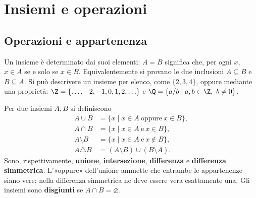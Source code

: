 \chapter{Insiemi e operazioni}

\section{Operazioni e appartenenza}
Un insieme è determinato dai suoi elementi: $A=B$ significa che, per ogni $x$, $x\in A$ se e solo se $x\in B$. Equivalentemente si provano le due inclusioni $A\subseteq B$ e $B\subseteq A$. Si può descrivere un insieme per elenco, come $\{2,3,4\}$, oppure mediante una proprietà: $\Z=\{\ldots,-2,-1,0,1,2,\ldots\}$ e $\Q=\{a/b\mid a,b\in\Z,\ b\ne0\}$.

\begin{definizione}
Per due insiemi $A,B$ si definiscono
\[
\begin{aligned}
A\cup B&=\{x\mid x\in A\ \text{oppure}\ x\in B\},\\
A\cap B&=\{x\mid x\in A\ \text{e}\ x\in B\},\\
A\setminus B&=\{x\mid x\in A\ \text{e}\ x\notin B\},\\
A\triangle B&=(A\setminus B)\cup(B\setminus A).
\end{aligned}
\]
Sono, rispettivamente, \textbf{unione}, \textbf{intersezione}, \textbf{differenza} e \textbf{differenza simmetrica}. L'«oppure» dell'unione ammette che entrambe le appartenenze siano vere; nella differenza simmetrica ne deve essere vera esattamente una. Gli insiemi sono \textbf{disgiunti} se $A\cap B=\varnothing$.
\end{definizione}

\begin{schema}
\end{schema}

